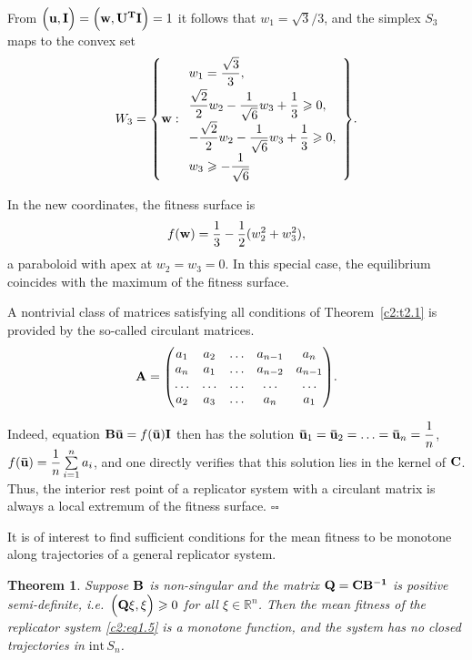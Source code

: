 \documentclass[12pt]{report}
\newcommand{\R}{\mathbb{R}}
\newcommand{\inside}{\mathrm{int}\,}
\newtheorem{theorem}{Theorem}[section]
\theoremstyle{definition}
\theoremstyle{remark}
\begin{document}
From $\Big({\bf u, I}\Big) = \Big({\bf w, U^{T}I}\Big) = 1$ it follows that $w_{1} = \sqrt{3}/3$, and the simplex $S_{3}$ maps to the convex set
\begin{equation*}
    W_{3} = \left\{{\bf w}: 
    \begin{array}{l}
        w_{1} = \dfrac{\sqrt{3}}{3},\\[6pt]
        \dfrac{\sqrt{2}}{2}w_{2} - \dfrac{1}{\sqrt{6}}w_{3} + \dfrac{1}{3} \geqslant 0,\\[6pt]
        -\dfrac{\sqrt{2}}{2}w_{2} - \dfrac{1}{\sqrt{6}}w_{3} + \dfrac{1}{3} \geqslant 0,\\[6pt]
        w_{3} \geqslant -\dfrac{1}{\sqrt{6}}
    \end{array}
    \right\}\!.
\end{equation*}

In the new coordinates, the fitness surface is
$$
f({\bf w}) = \frac{1}{3} - \frac{1}{2}(w_{2}^{2} + w_{3}^{2}),
$$
a paraboloid with apex at $w_{2} = w_{3} = 0$. In this special case, the equilibrium coincides with the maximum of the fitness surface.

A nontrivial class of matrices satisfying all conditions of Theorem~\ref{c2:t2.1} is provided by the so-called circulant matrices.
$$
{\bf A} = 
\begin{pmatrix}
	a_{1} & a_{2} & \ldots & a_{n - 1} & a_{n}\\
	a_{n} & a_{1} & \ldots & a_{n - 2} & a_{n - 1}\\
	\ldots & \ldots & \ldots & \ldots & \ldots\\
	a_{2} & a_{3} & \ldots & a_{n} & a_{1}\\
\end{pmatrix}\!.
$$ 

Indeed, equation ${\bf B\bar{u}} = f({\bf \bar{u}}){\bf I}$ then has the solution ${\bf \bar{u}}_{1} = {\bf \bar{u}}_{2} = \ldots = {\bf \bar{u}}_{n} = \dfrac{1}{n}$, $f({\bf \bar{u}}) = \dfrac{1}{n}\sum\limits_{i = 1}^{n}a_{i}$, and one directly verifies that this solution lies in the kernel of ${\bf C}$. Thus, the interior rest point of a replicator system with a circulant matrix is always a local extremum of the fitness surface.
\hfill$\square$\hfill$\square$

It is of interest to find sufficient conditions for the mean fitness to be monotone along trajectories of a general replicator system.
\begin{theorem}\label{c2:t2.2}
	Suppose ${\bf B}$ is non-singular and the matrix ${\bf Q = CB^{-1}}$ is positive semi-definite, i.e.\ $\Big({\bf Q\xi, \xi}\Big) \geqslant 0$ for all $\xi \in \R^{n}$. Then the mean fitness of the replicator system \eqref{c2:eq1.5} is a monotone function, and the system has no closed trajectories in $\inside S_{n}$.
\end{theorem} 
\end{document}
